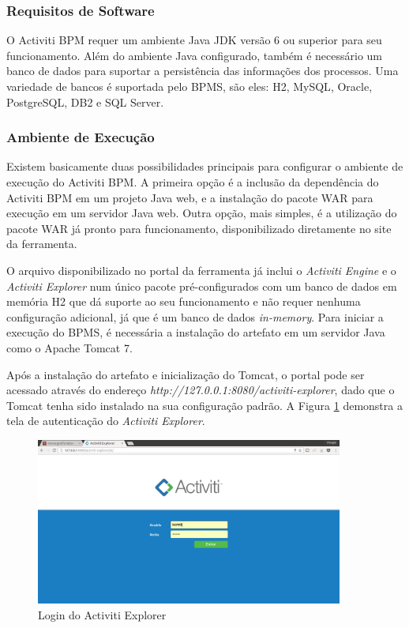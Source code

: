 \subsubsection{Requisitos de Software}\label{sec:automatizacao_processos-requisitos}

O Activiti BPM requer um ambiente Java JDK versão 6 ou superior para seu funcionamento. Além do ambiente Java configurado, também é necessário um banco de dados para suportar a persistência das informações dos processos. Uma variedade de bancos é suportada pelo BPMS, são eles: H2\cite{db_h2}, MySQL\cite{db_mysql}, Oracle\cite{db_oracle}, PostgreSQL\cite{db_postgres}, DB2\cite{db_db2} e SQL Server\cite{db_sqlserver}.

\subsubsection{Ambiente de Execução}\label{sec:automatizacao_processos-ambiente_desenvolvimento}

Existem basicamente duas possibilidades principais para configurar o ambiente de execução do Activiti BPM. A primeira opção é a inclusão da dependência do Activiti BPM em um projeto Java web, e a instalação do pacote WAR\cite{war} para execução em um servidor Java web. Outra opção, mais simples, é a utilização do pacote WAR já pronto para funcionamento, disponibilizado diretamente no site da ferramenta\cite{activiti_download}.

O arquivo disponibilizado no portal da ferramenta já inclui o \textit{Activiti Engine} e o \textit{Activiti Explorer} num único pacote pré-configurados com um banco de dados em memória H2\cite{h2_inmemory} que dá suporte ao seu funcionamento e não requer nenhuma configuração adicional, já que é um banco de dados \textit{in-memory}\cite{h2_inmemory}. Para iniciar a execução do BPMS, é necessária a instalação do artefato em um servidor Java como o Apache Tomcat 7\cite{tomcat7}.

Após a instalação do artefato e inicialização do Tomcat, o portal pode ser acessado através do endereço \textit{http://127.0.0.1:8080/activiti-explorer}, dado que o Tomcat tenha sido instalado na sua configuração padrão. A Figura \ref{fig:activiti_login} demonstra a tela de autenticação do \textit{Activiti Explorer}.

\begin{figure}[H]
\centering
\includegraphics[width=0.9\textwidth]{imagens/activiti_login.png}
\caption{Login do Activiti Explorer}
\label{fig:activiti_login}
\end{figure}

